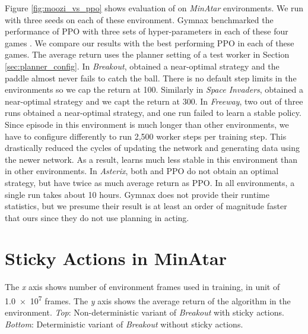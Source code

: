 
Figure \ref{fig:moozi_vs_ppo} shows evaluation of \moozi on \textit{MinAtar} environments.
We run \moozi with three seeds on each of these environment.
Gymnax benchmarked the performance of PPO with three sets of hyper-parameters in each of these four games \cite{GymnaxJAXbasedReinforcement_RobertTjarkoLange_2022,ProximalPolicyOptimization_Schulman.Wolski.ea_2017}.
We compare our results with the best performing PPO in each of these games.
The average return uses the planner setting of a test worker in Section \ref{sec:planner_config}.
In \textit{Breakout}, \moozi obtained a near-optimal strategy and the paddle almost never fails to catch the ball.
There is no default step limits in the environments so we cap the return at 100.
Similarly in \textit{Space Invaders}, \moozi obtained a near-optimal strategy and we capt the return at 300.
In \textit{Freeway}, two out of three runs  obtained a near-optimal strategy, and one run failed to learn a stable policy.
Since episode in this environment is much longer than other environments, we have to configure \moozi differently to run 2,500 worker steps per training step.
This drastically reduced the cycles of updating the network and generating data using the newer network.
As a result, \moozi learns much less stable in this environment than in other environments.
In \textit{Asterix}, both \moozi and PPO do not obtain an optimal strategy, but \moozi have twice as much average return as PPO.
In all environments, a single run takes about 10 hours.
Gymnax does not provide their runtime statistics, but we presume their result is at least an order of magnitude faster that ours since they do not use planning in acting.


\section{Sticky Actions in MinAtar} \label{sec:sticky_minatar}

{
    The \textit{x} axis shows number of environment frames used in training, in unit of \num{1.0e7} frames.
    The \textit{y} axis shows the average return of the algorithm in the environment.
    \textit{Top}: Non-deterministic variant of \textit{Breakout} with sticky actions.
    \textit{Bottom}: Deterministic variant of \textit{Breakout} without sticky actions.
}

